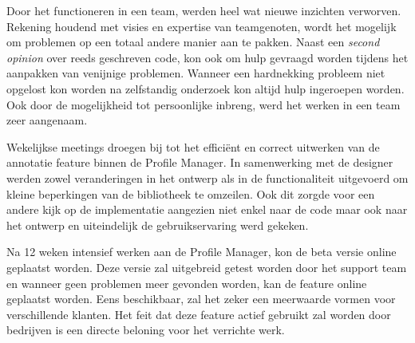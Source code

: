 Door het functioneren in een team, werden heel wat nieuwe inzichten verworven. Rekening houdend met visies en expertise van teamgenoten, wordt het mogelijk om problemen op een totaal andere manier aan te pakken. Naast een \textit{second opinion} over reeds geschreven code, kon ook om hulp gevraagd worden tijdens het aanpakken van venijnige problemen. Wanneer een hardnekking probleem niet opgelost kon worden na zelfstandig onderzoek kon altijd hulp ingeroepen worden. Ook door de mogelijkheid tot persoonlijke inbreng, werd het werken in een team zeer aangenaam. 

Wekelijkse meetings droegen bij tot het effici\"{e}nt en correct uitwerken van de annotatie feature binnen de Profile Manager. In samenwerking met de designer werden zowel veranderingen in het ontwerp als in de functionaliteit uitgevoerd om kleine beperkingen van de bibliotheek te omzeilen. Ook dit zorgde voor een andere kijk op de implementatie aangezien niet enkel naar de code maar ook naar het ontwerp en uiteindelijk de gebruikservaring werd gekeken. 

Na 12 weken intensief werken aan de Profile Manager, kon de beta versie online geplaatst worden. Deze versie zal uitgebreid getest worden door het support team en wanneer geen problemen meer gevonden worden, kan de feature online geplaatst worden. Eens beschikbaar, zal het zeker een meerwaarde vormen voor verschillende klanten. Het feit dat deze feature actief gebruikt zal worden door bedrijven is een directe beloning voor het verrichte werk.  

















